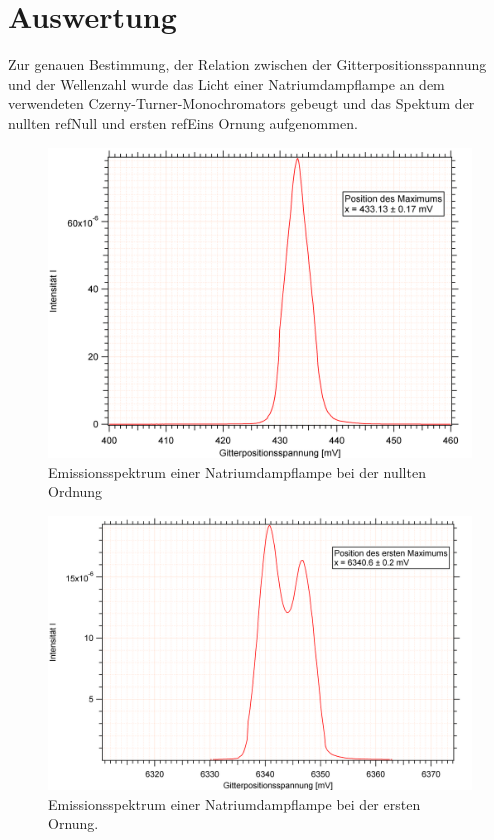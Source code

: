 


\section {Auswertung}

Zur genauen Bestimmung, der Relation zwischen der Gitterpositionsspannung und der Wellenzahl wurde das Licht einer Natriumdampflampe an dem verwendeten Czerny-Turner-Monochromators gebeugt und das Spektum der nullten ref{Null} und ersten ref{Eins} Ornung aufgenommen. 


\begin{figure}[H]
	\centering	
	\begin{minipage}{1\textwidth}
	\includegraphics[width=\columnwidth]{Bilder/Graph1.png}
	\end{minipage}
	
	
	\caption{Emissionsspektrum einer Natriumdampflampe bei der nullten Ordnung}
	

	\label{Null}
\end{figure}
\begin{figure}[H]
	\centering	
	\begin{minipage}{1\textwidth}
	\includegraphics[width=\columnwidth]{Bilder/Graph2.png}
	\end{minipage}
	
	
	\caption{Emissionsspektrum einer Natriumdampflampe bei der ersten Ornung.}
	
	
	\label{Eins}
\end{figure}
